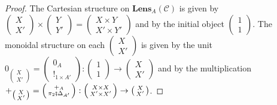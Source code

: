 \documentclass[12pt,a4paper,openright,twoside]{report}
\theoremstyle{plain}
\theoremstyle{definition}
\begin{document}
\begin{proof}
  The Cartesian structure on $\mathbf{Lens}_A(\mathcal{C})$ is given by $\left(\begin{smallmatrix}X \\ X'\end{smallmatrix}\right) \times \left(\begin{smallmatrix}Y \\ Y'\end{smallmatrix}\right) = \left(\begin{smallmatrix}X\times Y \\ X' \times Y'\end{smallmatrix}\right)$ and by the initial object $\left(\begin{smallmatrix}1 \\ 1\end{smallmatrix}\right)$. The monoidal structure on each $\left(\begin{smallmatrix}X \\ X'\end{smallmatrix}\right)$ is given by the unit $0_{\left(\begin{smallmatrix}X \\ X'\end{smallmatrix}\right)} = \left(\begin{smallmatrix}0_A \\ !_{1 \times A'}\end{smallmatrix}\right): \left(\begin{smallmatrix}1 \\ 1\end{smallmatrix}\right) \to \left(\begin{smallmatrix}X \\ X'\end{smallmatrix}\right)$ and by the multiplication $+_{\left(\begin{smallmatrix}X \\ X'\end{smallmatrix}\right)} = \left(\begin{smallmatrix}+_A \\ \pi_2 \fatsemi \Delta_{A'}\end{smallmatrix}\right): \left(\begin{smallmatrix}X \times X \\ X' \times X'\end{smallmatrix}\right) \to \left(\begin{smallmatrix}X \\ X'\end{smallmatrix}\right)$.
\end{proof}
\end{document}
